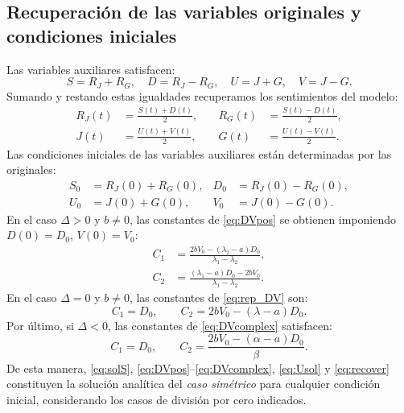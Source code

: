 \documentclass[10pt,letterpaper]{article}
\newcommand{\RJ}{R_{J}}
\newcommand{\RG}{R_{G}}
\begin{document}
\subsection{Recuperación de las variables originales y condiciones iniciales}
Las variables auxiliares satisfacen:
\begin{equation}
S=\RJ+\RG,\quad D=\RJ-\RG,\quad U=J+G,\quad V=J-G.
\end{equation}
Sumando y restando estas igualdades recuperamos los sentimientos del modelo:
\begin{equation}\label{eq:recover}
\boxed{\begin{aligned}
\RJ(t)&=\frac{S(t)+D(t)}{2},&\quad \RG(t)&=\frac{S(t)-D(t)}{2},\\[3pt]
J(t)&=\frac{U(t)+V(t)}{2},&\quad G(t)&=\frac{U(t)-V(t)}{2}.
\end{aligned}}
\end{equation}
Las condiciones iniciales de las variables auxiliares están determinadas por las originales:
\begin{equation}\label{eq:initial}
\begin{aligned}
S_0&=\RJ(0)+\RG(0),&D_0&=\RJ(0)-\RG(0),\\
U_0&=J(0)+G(0),&V_0&=J(0)-G(0).
\end{aligned}
\end{equation}
En el caso $\Delta>0$ y $b\ne0$, las constantes de \eqref{eq:DVpos} se obtienen imponiendo $D(0)=D_0$, $V(0)=V_0$:
\begin{equation}\label{eq:cons_pos}
\boxed{\begin{aligned}
C_1&=\frac{2bV_0-(\lambda_2-a)D_0}{\lambda_1-\lambda_2},\\
C_2&=\frac{(\lambda_1-a)D_0-2bV_0}{\lambda_1-\lambda_2}.
\end{aligned}}
\end{equation}
En el caso $\Delta=0$ y $b\ne0$, las constantes de \eqref{eq:rep_DV} son:
\begin{equation}
C_1=D_0,\qquad C_2=2bV_0-(\lambda-a)D_0.
\end{equation}
Por último, si $\Delta<0$, las constantes de \eqref{eq:DVcomplex} satisfacen:
\begin{equation}\label{eq:cons_complex}
C_1=D_0,\qquad C_2=\frac{2bV_0-(\alpha-a)D_0}{\beta}.
\end{equation}
De esta manera, \eqref{eq:solS}, \eqref{eq:DVpos}--\eqref{eq:DVcomplex}, \eqref{eq:Usol} y \eqref{eq:recover} constituyen la solución analítica del \emph{caso simétrico} para cualquier condición inicial, considerando los casos de división por cero indicados.
\end{document}
